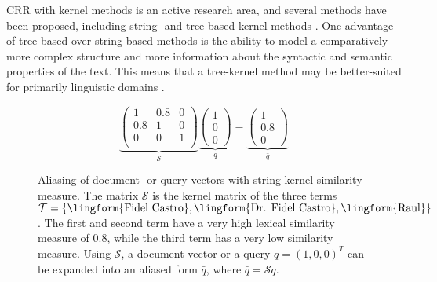 CRR with kernel methods is an active research area, and several methods have been proposed, including string- and tree-based kernel methods \cite{string_kernel_coref}.
One advantage of tree-based over string-based methods is the ability to model a comparatively-more complex structure and more information about the syntactic and semantic properties of the text. This means that a tree-kernel method may be better-suited for primarily linguistic domains .


\begin{figure}[ht]
  \caption{Aliasing of document- or query-vectors with string kernel similarity measure.
The matrix $\mathcal{S}$ is the kernel matrix of the three terms $\mathcal{T} = \lbrace
\text{\lingform{Fidel Castro}},\text{\lingform{Dr. Fidel Castro}}, \text{\lingform{Raul}}\rbrace$. The first and second term have a
very high lexical similarity measure of $0.8$, while the third term has a very low similarity measure. Using
$\mathcal{S}$, a document vector or a query $q=(1,0,0)^T$ can be expanded into an aliased form
$\bar q$, where $\bar q = \mathcal{S}q$.}
  \[
     \underbrace{\begin{pmatrix}
      1   & 0.8 & 0\\
      0.8 & 1   & 0\\
      0   & 0   & 1\\
     \end{pmatrix}}_{\mathcal{S}}
     \underbrace{\begin{pmatrix}
     1\\ 0\\0 
     \end{pmatrix}}_{q}
     =
     \underbrace{\begin{pmatrix}
     1\\ 0.8\\0 
     \end{pmatrix}}_{\bar q}
  \]
  \label{eq:example_string_sim}
\end{figure}

